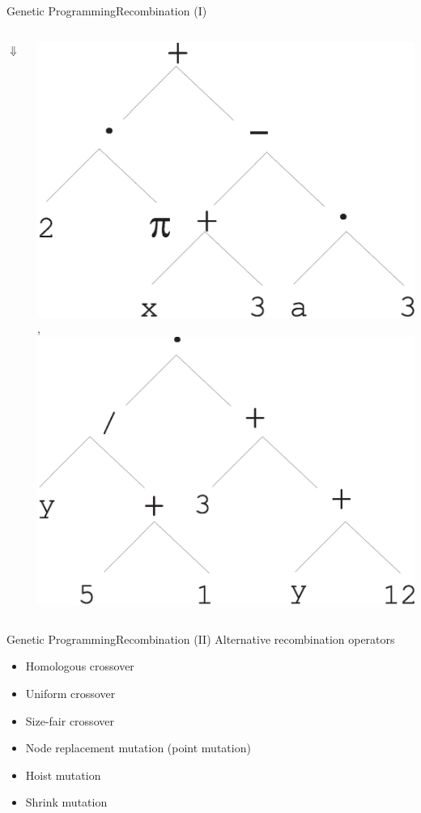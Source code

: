 \documentclass[10pt,compress]{beamer} %
\begin{document}
\begin{frame}[fragile]{Genetic Programming}{Recombination (I)}
\begin{columns}
			\begin{center}
				$\Downarrow$
			\end{center}

			\begin{columns}
					\includegraphics[width=\linewidth]{figs/gpchildacrossover.eps} 
					,
					\includegraphics[width=\linewidth]{figs/gpchildbcrossover.eps}
			\end{columns}

	\end{columns}
\end{frame}

\begin{frame}{Genetic Programming}{Recombination (II)} 
	Alternative recombination operators
	\begin{itemize}
		\item Homologous crossover
		\item Uniform crossover
		\item Size-fair crossover
		\item Node replacement mutation (point mutation)
		\item Hoist mutation
		\item Shrink mutation
	\end{itemize}
\end{frame}
\end{document}
